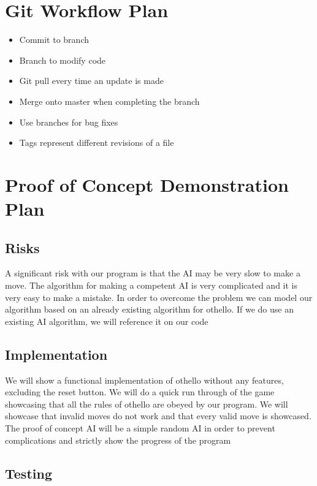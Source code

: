 \documentclass{article}
\begin{document}
\section*{Git Workflow Plan}
\begin{itemize}
	\item Commit to branch
	\item Branch to modify code
	\item Git pull every time an update is made
	\item Merge onto master when completing the branch
	\item Use branches for bug fixes
	\item Tags represent different revisions of a file
\end{itemize}


\section*{Proof of Concept Demonstration Plan}

\subsection*{Risks}

A significant risk with our program is that the AI may be very slow to make a move. The algorithm for making a competent AI is very complicated and it is very easy to make a mistake. In order to overcome the problem we can model our algorithm based on an already existing algorithm for othello. {\color{blue}If we do use an existing AI algorithm, we will reference it on our code}

\subsection*{Implementation}

{\color {blue} We will show a functional implementation of othello without any features, excluding the reset button. We will do a quick run through of the game showcasing that all the rules of othello are obeyed by our program. We will showcase that invalid moves do not work and  that every valid move is showcased. The proof of concept AI will be a simple random AI in order to  prevent complications and strictly show the progress of the program}

\subsection*{Testing}
\end{document}
